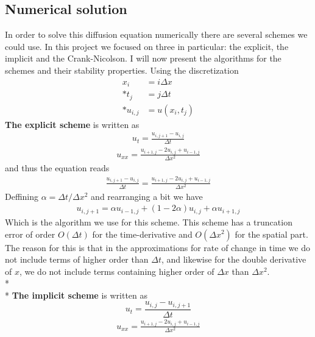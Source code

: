 \documentclass[norsk, a4paper]{article}
\begin{document}
\subsection{Numerical solution}
In order to solve this diffusion equation numerically there are several schemes we could use. In this project we focused on three in particular: the explicit, the implicit and the Crank-Nicolson. I will now present the algorithms for the schemes and their stability properties. Using the discretization 
\begin{align*}
x_i &= i\Delta x\\*
t_j &= j\Delta t\\*
u_{i,j} &= u(x_i,t_j)
\end{align*}
\textbf{The explicit scheme} is written as 
\begin{align}
u_t = \frac{u_{i,j+1} - u_{i,j}}{\Delta t} \label{utexplicit}
\end{align}
\begin{align}
u_{xx} = \frac{u_{i+1,j}-2u_{i,j} + u_{i-1,j}}{\Delta x^2} \label{xxexplicit}
\end{align}
and thus the equation reads
\begin{align*}
 \frac{u_{i,j+1} - u_{i,j}}{\Delta t}  = \frac{u_{i+1,j}-2u_{i,j} + u_{i-1,j}}{\Delta x^2} 
\end{align*}
Deffining $\alpha = \Delta t/\Delta x^2$ and rearranging a bit we have
\begin{align}
u_{i,j+1} = \alpha u_{i-1,j} + (1-2\alpha)u_{i,j} + \alpha u_{i+1,j} \label{expalgo}
\end{align}
Which is the algorithm we use for this scheme. This scheme has a truncation error of order $O(\Delta t)$ for the time-derivative and $O(\Delta x^2)$ for the spatial part. The reason for this is that in the approximations for rate of change in time we do not include terms of higher order than $\Delta t$, and likewise for the double derivative of $x$, we do not include terms containing higher order of $\Delta x$ than $\Delta x^2$. \\*
\\*
\textbf{The implicit scheme} is written as
\begin{equation}
u_t = \frac{u_{i,j}-u_{i,j+1}}{\Delta t} \label{utimplicit}
\end{equation}
\begin{align}
u_{xx} = \frac{u_{i+1,j}-2u_{i,j} + u_{i-1,j}}{\Delta x^2}
\end{align}
\end{document}
